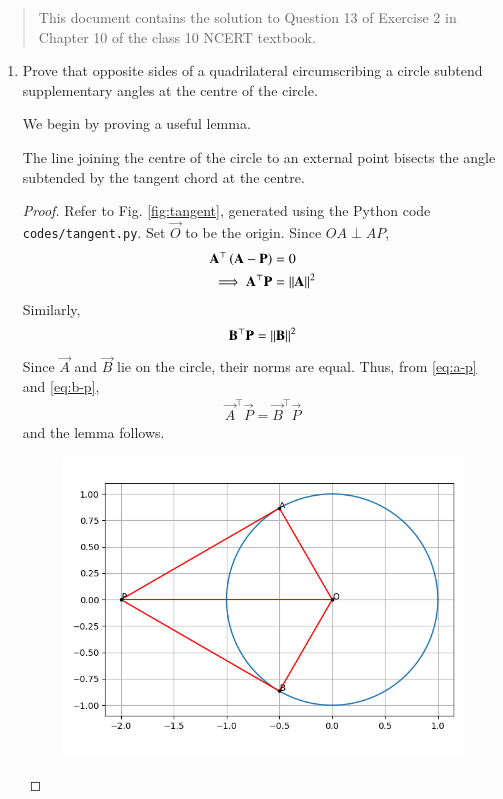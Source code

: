 \documentclass[journal,12pt,twocolumn]{IEEEtran}
\begin{document}
\begin{abstract}
    This document contains the solution to Question 13 of 
    Exercise 2 in Chapter 10 of the class 10 NCERT textbook.
\end{abstract}

\begin{enumerate}
    \item Prove that opposite sides of a quadrilateral circumscribing a circle 
    subtend supplementary angles at the centre of the circle.

    \solution We begin by proving a useful lemma.
    \begin{lemma}
        The line joining the centre of the circle to an external point bisects
        the angle subtended by the tangent chord at the centre.
    \end{lemma}
    \begin{proof}
        Refer to Fig. \ref{fig:tangent}, generated using the Python code 
        \texttt{codes/tangent.py}. Set $\vec{O}$ to be the origin. Since 
        $OA \perp AP$,
        \begin{align}
            \mathbf{A}^\top\left(\mathbf{A}-\mathbf{P}\right) &= 0 \\
            \implies \mathbf{A}^\top\mathbf{P} &= \left\lVert\mathbf{A}\right\rVert^2
            \label{eq:a-p}
        \end{align}
        Similarly,
        \begin{align}
            \mathbf{B}^\top\mathbf{P} = \left\lVert\mathbf{B}\right\rVert^2
            \label{eq:b-p}
        \end{align}
        Since $\vec{A}$ and $\vec{B}$ lie on the circle, their norms are equal.
        Thus, from \eqref{eq:a-p} and \eqref{eq:b-p},
        \begin{align}
            \vec{A}^\top\vec{P} = \vec{B}^\top\vec{P}
        \end{align}
        and the lemma follows.
        \begin{figure}[!ht]
            \centering
            \includegraphics[width=\columnwidth]{figs/tangent.png}

\end{figure}
\end{proof}
\end{enumerate}
\end{document}
